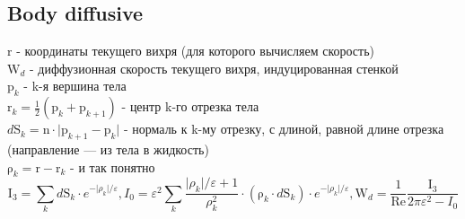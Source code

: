 \documentclass[11pt]{article}
\newcommand{\br}[1]{\boldsymbol{\mathrm{#1}}}
\newcommand{\Reyn}{\text{Re}}
\begin{document}
\begin{center}\setlength\fboxsep{0pt}
\setlength\fboxrule{0.5pt}
\end{center}

\subsection{Body diffusive}

$\br r$ - координаты текущего вихря (для которого вычисляем скорость) \\
$\br W_d$ - диффузионная скорость текущего вихря, индуцированная стенкой \\
$\br p_k$ - k-я вершина тела \\
$\br r_k = \frac{1}{2}(\br p_k + \br p_{k+1})$ - центр k-го отрезка тела \\
$d \br S_k = \br n \cdot\lvert\br p_{k+1} - \br p_k \rvert$ - нормаль к k-му отрезку, с длиной, равной длине отрезка (направление --- из тела в жидкость) \\
$\br{\rho}_k = \br r - \br r_k$ - и так понятно \\

\begin{equation*}
\br I_3 = {\sum\limits_k d\br S_k\cdot e^{-\lvert\rho_k\rvert/\varepsilon}},
I_0 = {\varepsilon^2\sum\limits_k \dfrac{\lvert\rho_k\rvert /\varepsilon +1}{\rho_k^2}
\cdot(\br\rho_k \cdot d\br S_k)\cdot e^{-\lvert\rho_k\rvert/\varepsilon}},
\br W_d = \dfrac{1}{\Reyn} \dfrac{\br I_3}{2\pi\varepsilon^2 - I_0}
\end{equation*}
\end{document}
